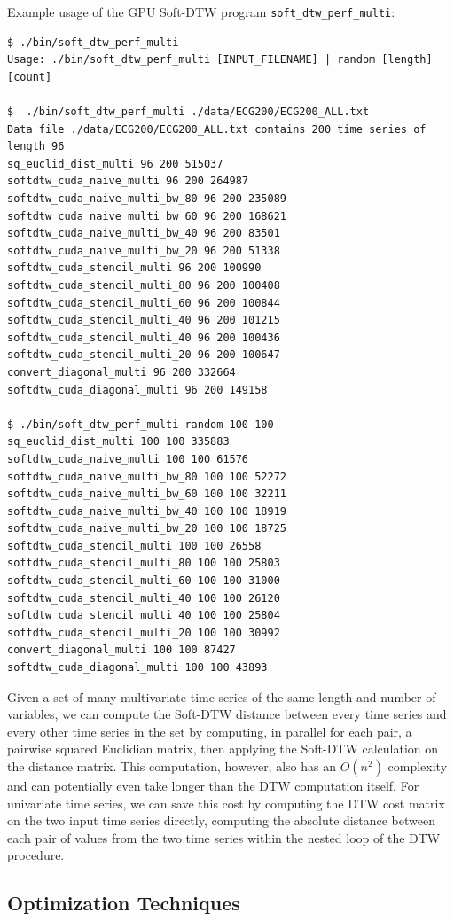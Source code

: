 \documentclass[12pt, letterpaper]{article}
\begin{document}
Example usage of the GPU Soft-DTW program \verb|soft_dtw_perf_multi|:

\begin{verbatim}
$ ./bin/soft_dtw_perf_multi
Usage: ./bin/soft_dtw_perf_multi [INPUT_FILENAME] | random [length] [count]

$  ./bin/soft_dtw_perf_multi ./data/ECG200/ECG200_ALL.txt
Data file ./data/ECG200/ECG200_ALL.txt contains 200 time series of length 96
sq_euclid_dist_multi 96 200 515037
softdtw_cuda_naive_multi 96 200 264987
softdtw_cuda_naive_multi_bw_80 96 200 235089
softdtw_cuda_naive_multi_bw_60 96 200 168621
softdtw_cuda_naive_multi_bw_40 96 200 83501
softdtw_cuda_naive_multi_bw_20 96 200 51338
softdtw_cuda_stencil_multi 96 200 100990
softdtw_cuda_stencil_multi_80 96 200 100408
softdtw_cuda_stencil_multi_60 96 200 100844
softdtw_cuda_stencil_multi_40 96 200 101215
softdtw_cuda_stencil_multi_40 96 200 100436
softdtw_cuda_stencil_multi_20 96 200 100647
convert_diagonal_multi 96 200 332664
softdtw_cuda_diagonal_multi 96 200 149158

$ ./bin/soft_dtw_perf_multi random 100 100
sq_euclid_dist_multi 100 100 335883
softdtw_cuda_naive_multi 100 100 61576
softdtw_cuda_naive_multi_bw_80 100 100 52272
softdtw_cuda_naive_multi_bw_60 100 100 32211
softdtw_cuda_naive_multi_bw_40 100 100 18919
softdtw_cuda_naive_multi_bw_20 100 100 18725
softdtw_cuda_stencil_multi 100 100 26558
softdtw_cuda_stencil_multi_80 100 100 25803
softdtw_cuda_stencil_multi_60 100 100 31000
softdtw_cuda_stencil_multi_40 100 100 26120
softdtw_cuda_stencil_multi_40 100 100 25804
softdtw_cuda_stencil_multi_20 100 100 30992
convert_diagonal_multi 100 100 87427
softdtw_cuda_diagonal_multi 100 100 43893
\end{verbatim}

Given a set of many multivariate time series of the same length and number of
variables, we can compute the Soft-DTW distance between every time series and
every other time series in the set by computing, in parallel for each pair, a
pairwise squared Euclidian matrix, then applying the Soft-DTW calculation on the
distance matrix. This computation, however, also has an $O(n^2)$ complexity and
can potentially even take longer than the DTW computation itself. For univariate
time series, we can save this cost by computing the DTW cost matrix on the two
input time series directly, computing the absolute distance between each pair of
values from the two time series within the nested loop of the DTW procedure.

\subsection{Optimization Techniques}
\end{document}
